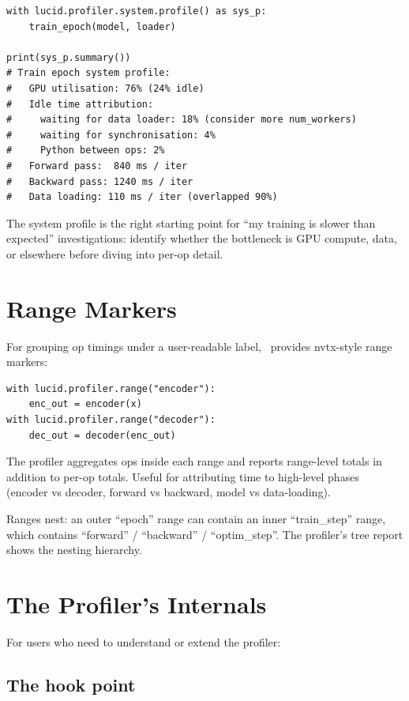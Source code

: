 \begin{lstlisting}[style=lucid,language=LucidPython]
with lucid.profiler.system.profile() as sys_p:
    train_epoch(model, loader)

print(sys_p.summary())
# Train epoch system profile:
#   GPU utilisation: 76% (24% idle)
#   Idle time attribution:
#     waiting for data loader: 18% (consider more num_workers)
#     waiting for synchronisation: 4%
#     Python between ops: 2%
#   Forward pass:  840 ms / iter
#   Backward pass: 1240 ms / iter
#   Data loading: 110 ms / iter (overlapped 90%)
\end{lstlisting}

The system profile is the right starting point for
``my training is slower than expected'' investigations:
identify whether the bottleneck is GPU compute, data, or
elsewhere before diving into per-op detail.

\section{Range Markers}
\label{sec:profiler_determinism:ranges}

For grouping op timings under a user-readable label,
\Lucid\ provides nvtx-style range markers:

\begin{lstlisting}[style=lucid,language=LucidPython]
with lucid.profiler.range("encoder"):
    enc_out = encoder(x)
with lucid.profiler.range("decoder"):
    dec_out = decoder(enc_out)
\end{lstlisting}

The profiler aggregates ops inside each range and reports
range-level totals in addition to per-op totals. Useful for
attributing time to high-level phases (encoder vs decoder,
forward vs backward, model vs data-loading).

Ranges nest: an outer ``epoch'' range can contain an inner
``train\_step'' range, which contains ``forward'' /
``backward'' / ``optim\_step''. The profiler's tree report
shows the nesting hierarchy.

\section{The Profiler's Internals}
\label{sec:profiler_determinism:internals}

For users who need to understand or extend the profiler:

\subsection{The hook point}
\label{ssec:profiler_determinism:hook_point}

